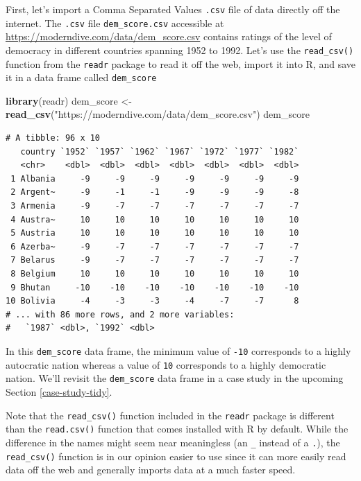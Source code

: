 \documentclass[12pt, krantz2,]{krantz}
\makeatletter
\newenvironment{Shaded}{\begin{snugshade}}{\end{snugshade}}
\newcommand{\KeywordTok}[1]{\textcolor[rgb]{0.27,0.27,0.27}{\textbf{#1}}}
\newcommand{\NormalTok}[1]{#1}
\newcommand{\StringTok}[1]{\textcolor[rgb]{0.5,0.5,0.5}{#1}}
\newenvironment{kframe}{%
\medskip{}
\setlength{\fboxsep}{.8em}
 \def\at@end@of@kframe{}%
 \ifinner\ifhmode%
  \def\at@end@of@kframe{\end{minipage}}%
  \begin{minipage}{\columnwidth}%
 \fi\fi%
 \def\FrameCommand##1{\hskip\@totalleftmargin \hskip-\fboxsep
 \colorbox{shadecolor}{##1}\hskip-\fboxsep
     \hskip-\linewidth \hskip-\@totalleftmargin \hskip\columnwidth}%
 \MakeFramed {\advance\hsize-\width
   \@totalleftmargin\z@ \linewidth\hsize
   \@setminipage}}%
 {\par\unskip\endMakeFramed%
 \at@end@of@kframe}
\renewenvironment{Shaded}{\begin{kframe}}{\end{kframe}}
\makeatother
\begin{document}
First, let's import a Comma Separated Values \texttt{.csv} file of data directly off the internet. The \texttt{.csv} file \texttt{dem\_score.csv} accessible at \url{https://moderndive.com/data/dem_score.csv} contains ratings of the level of democracy in different countries spanning 1952 to 1992. Let's use the \texttt{read\_csv()} function from the \texttt{readr} package to read it off the web, import it into R, and save it in a data frame called \texttt{dem\_score}

\begin{Shaded}
\begin{Highlighting}[]
\KeywordTok{library}\NormalTok{(readr)}
\NormalTok{dem_score <-}\StringTok{ }\KeywordTok{read_csv}\NormalTok{(}\StringTok{"https://moderndive.com/data/dem_score.csv"}\NormalTok{)}
\NormalTok{dem_score}
\end{Highlighting}
\end{Shaded}

\begin{verbatim}
# A tibble: 96 x 10
   country `1952` `1957` `1962` `1967` `1972` `1977` `1982`
   <chr>    <dbl>  <dbl>  <dbl>  <dbl>  <dbl>  <dbl>  <dbl>
 1 Albania     -9     -9     -9     -9     -9     -9     -9
 2 Argent~     -9     -1     -1     -9     -9     -9     -8
 3 Armenia     -9     -7     -7     -7     -7     -7     -7
 4 Austra~     10     10     10     10     10     10     10
 5 Austria     10     10     10     10     10     10     10
 6 Azerba~     -9     -7     -7     -7     -7     -7     -7
 7 Belarus     -9     -7     -7     -7     -7     -7     -7
 8 Belgium     10     10     10     10     10     10     10
 9 Bhutan     -10    -10    -10    -10    -10    -10    -10
10 Bolivia     -4     -3     -3     -4     -7     -7      8
# ... with 86 more rows, and 2 more variables:
#   `1987` <dbl>, `1992` <dbl>
\end{verbatim}

In this \texttt{dem\_score} data frame, the minimum value of \texttt{-10} corresponds to a highly autocratic nation whereas a value of \texttt{10} corresponds to a highly democratic nation. We'll revisit the \texttt{dem\_score} data frame in a case study in the upcoming Section \ref{case-study-tidy}.

Note that the \texttt{read\_csv()} function included in the \texttt{readr} package is different than the \texttt{read.csv()} function that comes installed with R by default. While the difference in the names might seem near meaningless (an \texttt{\_} instead of a \texttt{.}), the \texttt{read\_csv()} function is in our opinion easier to use since it can more easily read data off the web and generally imports data at a much faster speed.
\end{document}
